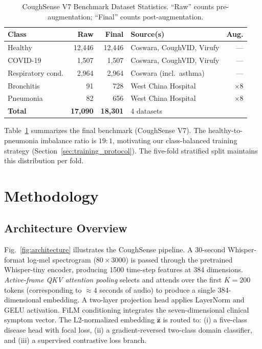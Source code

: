 \documentclass[10pt,journal,compsoc]{IEEEtran}
\begin{document}
\begin{table}[!t]
\caption{CoughSense V7 Benchmark Dataset Statistics.
         ``Raw'' counts pre-augmentation; ``Final'' counts post-augmentation.}
\label{tab:dataset}
\centering
\setlength{\tabcolsep}{4pt}
\begin{tabular}{lrrlr}
\toprule
\textbf{Class} & \textbf{Raw} & \textbf{Final} & \textbf{Source(s)} &
\textbf{Aug.} \\
\midrule
Healthy            & 12{,}446 & 12{,}446 & Coswara, CoughVID, Virufy & ---       \\
COVID-19           &  1{,}507 &  1{,}507 & Coswara, CoughVID, Virufy & ---       \\
Respiratory cond.  &  2{,}964 &  2{,}964 & Coswara (incl.\ asthma)   & ---       \\
Bronchitis         &     91   &    728   & West China Hospital        & $\times$8 \\
Pneumonia          &     82   &    656   & West China Hospital        & $\times$8 \\
\midrule
\textbf{Total}     & \textbf{17{,}090} & \textbf{18{,}301} & 4 datasets & \\
\bottomrule
\end{tabular}
\end{table}

Table~\ref{tab:dataset} summarizes the final benchmark (CoughSense V7).
The healthy-to-pneumonia imbalance ratio is $19\!:\!1$, motivating our
class-balanced training strategy (Section~\ref{sec:training_protocol}).
The five-fold stratified split maintains this distribution per fold.

\section{Methodology}
\label{sec:method}

\subsection{Architecture Overview}

Fig.~\ref{fig:architecture} illustrates the CoughSense pipeline.
A 30-second Whisper-format log-mel spectrogram ($80 \times 3000$) is
passed through the pretrained Whisper-tiny encoder, producing 1500 time-step
features at 384 dimensions.
\textit{Active-frame QKV attention pooling} selects and attends over
the first $K = 200$ tokens (corresponding to $\approx 4$ seconds of audio)
to produce a single 384-dimensional embedding.
A two-layer projection head applies LayerNorm and GELU activation.
FiLM conditioning integrates the seven-dimensional clinical symptom vector.
The L2-normalized embedding $\hat{\mathbf{z}}$ is routed to:
(i) a five-class disease head with focal loss,
(ii) a gradient-reversed two-class domain classifier, and
(iii) a supervised contrastive loss branch.
\end{document}
